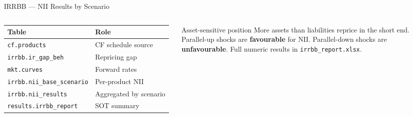 \documentclass[aspectratio=169,10pt]{beamer}
\newcommand{\pos}[1]{\textcolor{labgrn}{\textbf{#1}}}
\newcommand{\neg}[1]{\textcolor{labred}{\textbf{#1}}}
\begin{document}
\begin{frame}{IRRBB — NII Results by Scenario}
\begin{columns}[T]
      \vspace{4pt}
      \small
      \begin{tabular}{ll}
        \toprule
        Table & Role \\
        \midrule
        \texttt{cf.products}           & CF schedule source \\
        \texttt{irrbb.ir\_gap\_beh}    & Repricing gap \\
        \texttt{mkt.curves}            & Forward rates \\
        \texttt{irrbb.nii\_base\_scenario} & Per-product NII \\
        \texttt{irrbb.nii\_results}    & Aggregated by scenario \\
        \texttt{results.irrbb\_report} & SOT summary \\
        \bottomrule
      \end{tabular}

      \vspace{8pt}
      \normalsize
      \begin{block}{Asset-sensitive position}
        \small More assets than liabilities reprice in the short end.
        Parallel-up shocks are \pos{favourable} for NII.
        Parallel-down shocks are \neg{unfavourable}.
        Full numeric results in \texttt{irrbb\_report.xlsx}.
      \end{block}
  \end{columns}
\end{frame}
\end{document}
